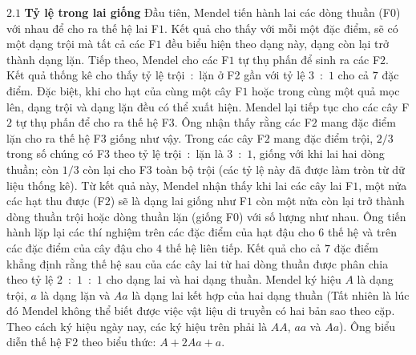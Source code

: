 \begin{multicols}{2}
	\vskip 0.1cm
	$\pmb{2.1}$ \textbf{\color{timhieukhoahoc}Tỷ lệ trong lai giống}
	\vskip 0.1cm
	Đầu tiên, Mendel tiến hành lai các dòng thuần (F$0$) với nhau để cho ra thế hệ lai F$1$. Kết quả cho thấy với mỗi một đặc điểm, sẽ có một dạng trội mà tất cả các F$1$ đều biểu hiện theo dạng này, dạng còn lại trở thành dạng lặn. Tiếp theo, Mendel cho các F$1$ tự thụ phấn để sinh ra các F$2$. Kết quả thống kê cho thấy tỷ lệ trội~:~lặn ở F2 gần với tỷ lệ $3$~:~$1$ cho cả $7$ đặc điểm. Đặc biệt, khi cho hạt của cùng một cây F$1$ hoặc trong cùng một quả mọc lên, dạng trội và dạng lặn đều có thể xuất hiện.
	\vskip 0.1cm
	Mendel lại tiếp tục cho các cây F$2$ tự thụ phấn để cho ra thế hệ F$3$. Ông nhận thấy rằng các F$2$ mang đặc điểm lặn cho ra thế hệ F$3$ giống như vậy. Trong các cây F$2$ mang đặc điểm trội, $2/3$ trong số chúng có F$3$ theo tỷ lệ trội~:~lặn là $3$~:~$1$, giống với khi lai hai dòng thuần; còn $1/3$ còn lại cho F$3$ toàn bộ trội (các tỷ lệ này đã được làm tròn từ dữ liệu thống kê). Từ kết quả này, Mendel nhận thấy khi lai các cây lai F$1$, một nửa các hạt thu được (F$2$) sẽ là dạng lai giống như F$1$ còn một nửa còn lại trở thành dòng thuần trội hoặc dòng thuần lặn (giống F$0$) với số lượng như nhau.
	\vskip 0.1cm
	Ông tiến hành lặp lại các thí nghiệm trên các đặc điểm của hạt đậu cho $6$ thế hệ và trên các đặc điểm của cây đậu cho $4$ thế hệ liên tiếp. Kết quả cho cả $7$ đặc điểm khẳng định rằng thế hệ sau của các cây lai từ hai dòng thuần được phân chia theo tỷ lệ $2$~:~$1$~:~$1$ cho dạng lai và hai dạng thuần.
	\vskip 0.1cm
	Mendel ký hiệu $A$ là dạng trội, $a$ là dạng lặn và $Aa$ là dạng lai kết hợp của hai dạng thuần (Tất nhiên là lúc đó Mendel không thể biết được việc vật liệu di truyền có hai bản sao theo cặp. Theo cách ký hiệu ngày nay, các ký hiệu trên phải là $AA$, $aa$ và $Aa$). Ông biểu diễn thế hệ F$2$ theo biểu thức: $A + 2Aa + a$.
	\begin{figure}[H]
		\centering
		\vspace*{-5pt}
		\captionsetup{labelformat= empty, justification=centering}

\end{figure}
\end{multicols}
